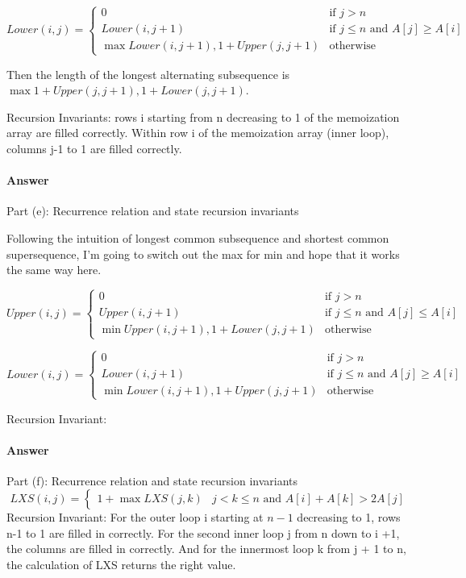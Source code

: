 \documentclass{article}
\begin{document}
\begin{equation}
Lower(i,j) = 
\begin{cases}
0 & \text{if $j > n$}\\
Lower(i, j+1) & \text{if $j \leq n$ and $A[j] \geq A[i]$}\\
\max{Lower(i, j+1), 1 + Upper(j, j+1)} & \text{otherwise}
\end{cases}
\end{equation}

Then the length of the longest alternating subsequence is $\max{1 + Upper(j, j+1), 1 + Lower(j, j+1)}$.

Recursion Invariants: rows i starting from n decreasing to 1 of the memoization array are filled correctly. Within row i of the memoization array (inner loop), columns j-1 to 1 are filled correctly. 

\paragraph{Answer}{Part (e): Recurrence relation and state recursion invariants}

Following the intuition of longest common subsequence and shortest common supersequence, I'm going to switch out the max for min and hope that it works the same way here. 

\begin{equation}
Upper(i,j) = 
\begin{cases}
0 & \text{if $j > n$}\\
Upper(i, j+1) & \text{if $j \leq n$ and $A[j] \leq A[i]$}\\
\min{Upper(i, j+1), 1 + Lower(j, j+1)} & \text{otherwise}
\end{cases}
\end{equation}

\begin{equation}
Lower(i,j) = 
\begin{cases}
0 & \text{if $j > n$}\\
Lower(i, j+1) & \text{if $j \leq n$ and $A[j] \geq A[i]$}\\
\min{Lower(i, j+1), 1 + Upper(j, j+1)} & \text{otherwise}
\end{cases}
\end{equation}

Recursion Invariant: \todo{}

\paragraph{Answer}{Part (f): Recurrence relation and state recursion invariants}
\begin{equation}
LXS(i,j) =
\begin{cases}
1 + \max{LXS(j, k)} & \text{$j < k \leq n$ and $A[i] + A[k] > 2A[j]$}
\end{cases}
\end{equation}
Recursion Invariant: For the outer loop i starting at $n-1$ decreasing to 1, rows n-1 to 1 are filled in correctly. For the second inner loop j from n down to i +1, the columns are filled in correctly. And for the innermost loop k from j + 1 to n, the calculation of LXS returns the right value. 
\end{document}
